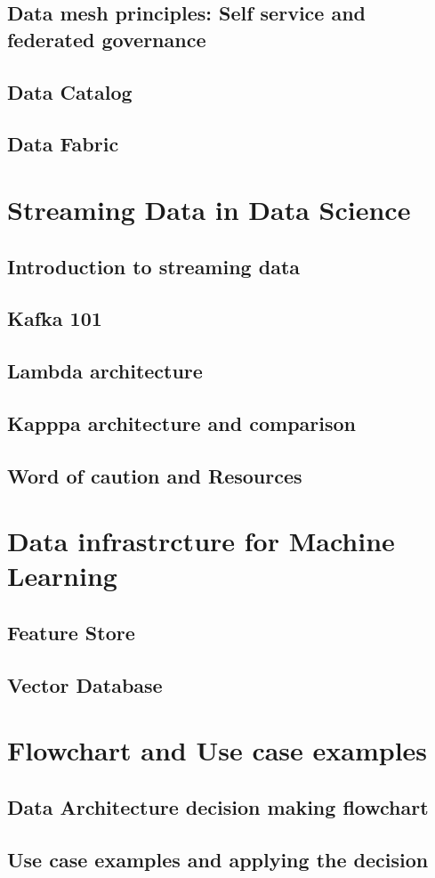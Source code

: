 \documentclass[11pt]{article}
\begin{document}
    \subsection{Data mesh principles: Self service and federated governance}

    \subsection{Data Catalog}

    \subsection{Data Fabric}

    \section{Streaming Data in Data Science}

    \subsection{Introduction to streaming data}
    
    \subsection{Kafka 101} %
    
    \subsection{Lambda architecture}
    
    \subsection{Kapppa architecture and comparison}
    
    \subsection{Word of caution and Resources}

    \section{Data infrastrcture for Machine Learning}

    \subsection{Feature Store}

    \subsection{Vector Database}

    \section{Flowchart and Use case examples}

    \subsection{Data Architecture decision making flowchart}

    \subsection{Use case examples and applying the decision}
\end{document}
